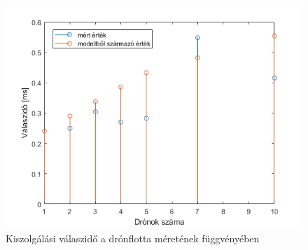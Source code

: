 \begin{figure}
	\centering
	\includegraphics{figures/meres_iperf_model.png}
	\caption{Kiszolgálási válaszidő a drónflotta méretének függvényében}
	\label{fig:meresros}
\end{figure}

